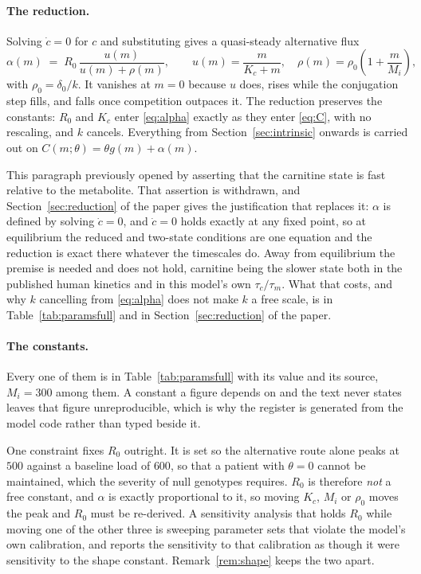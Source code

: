 \paragraph{The reduction.} Solving
$\dot c = 0$ for $c$ and substituting gives a quasi-steady alternative flux
\begin{equation}
\alpha(m) \;=\; R_0\,\frac{u(m)}{u(m) + \rho(m)},
\qquad u(m) = \frac{m}{K_c+m}, \quad \rho(m) = \rho_0\left(1 + \frac{m}{M_i}\right),
\label{eq:alpha}
\end{equation}
with $\rho_0 = \delta_0/k$. It vanishes at $m = 0$ because $u$ does, rises while the
conjugation step fills, and falls once competition outpaces it. The reduction preserves the
constants: $R_0$ and $K_c$ enter \eqref{eq:alpha} exactly as they enter \eqref{eq:C}, with
no rescaling, and $k$ cancels. Everything from Section~\ref{sec:intrinsic} onwards is
carried out on $C(m;\theta) = \theta g(m) + \alpha(m)$.

This paragraph previously opened by asserting that the carnitine state is fast relative to
the metabolite. That assertion is withdrawn, and Section~\ref{sec:reduction} of the paper gives
the justification that replaces it: $\alpha$ is defined by solving $\dot c = 0$, and
$\dot c = 0$ holds exactly at any fixed point, so at equilibrium the reduced and two-state
conditions are one equation and the reduction is exact there whatever the timescales do.
Away from equilibrium the premise is needed and does not hold, carnitine being the slower
state both in the published human kinetics and in this model's own $\tau_c/\tau_m$. What
that costs, and why $k$ cancelling from \eqref{eq:alpha} does not make $k$ a free scale, is
in Table~\ref{tab:paramsfull} and in Section~\ref{sec:reduction} of the paper.

\paragraph{The constants.} Every one of them is in Table~\ref{tab:paramsfull} with its
value and its source, $M_i = 300$ among them. A constant a figure depends on and the text
never states leaves that figure unreproducible, which is why the register is generated from
the model code rather than typed beside it.

One constraint fixes $R_0$ outright. It is set so the alternative route alone peaks at $500$
against a baseline load of $600$, so that a patient with $\theta = 0$ cannot be maintained,
which the severity of null genotypes requires. $R_0$ is therefore \emph{not} a free
constant, and $\alpha$ is exactly proportional to it, so moving $K_c$, $M_i$ or $\rho_0$
moves the peak and $R_0$ must be re-derived. A sensitivity analysis that holds $R_0$ while
moving one of the other three is sweeping parameter sets that violate the model's own
calibration, and reports the sensitivity to that calibration as though it were sensitivity
to the shape constant. Remark~\ref{rem:shape} keeps the two apart.


